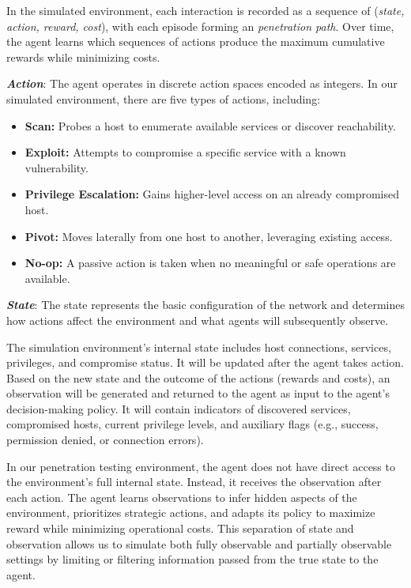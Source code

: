 In the simulated environment, each interaction is recorded as a sequence of (\textit{state, action, reward, cost}), with each episode forming an \emph{penetration path}. Over time, the agent learns which sequences of actions produce the maximum cumulative rewards while minimizing costs.

\noindent \textit{\textbf{Action}}: 
The agent operates in discrete action spaces encoded as integers. In our simulated environment, there are five types of actions, including:
\begin{itemize}
    \item \textbf{Scan:} Probes a host to enumerate available services or discover reachability.
    \item \textbf{Exploit:} Attempts to compromise a specific service with a known vulnerability.
    \item \textbf{Privilege Escalation:} Gains higher-level access on an already compromised host.
    \item \textbf{Pivot:} Moves laterally from one host to another, leveraging existing access.
    \item \textbf{No-op:} A passive action is taken when no meaningful or safe operations are available.
\end{itemize}

\noindent \textit{\textbf{State}}:
The state represents the basic configuration of the network and determines how actions affect the environment and what agents will subsequently observe.

The simulation environment's internal state includes host connections, services, privileges, and compromise status. It will be updated after the agent takes action. Based on the new state and the outcome of the actions (rewards and costs), an observation will be generated and returned to the agent as input to the agent’s decision-making policy. It will contain indicators of discovered services, compromised hosts, current privilege levels, and auxiliary flags (e.g., success, permission denied, or connection errors). 


In our penetration testing environment, the agent does not have direct access to the environment’s full internal state. Instead, it receives the observation after each action. The agent learns observations to infer hidden aspects of the environment, prioritizes strategic actions, and adapts its policy to maximize reward while minimizing operational costs. This separation of state and observation allows us to simulate both fully observable and partially observable settings by limiting or filtering information passed from the true state to the agent.

